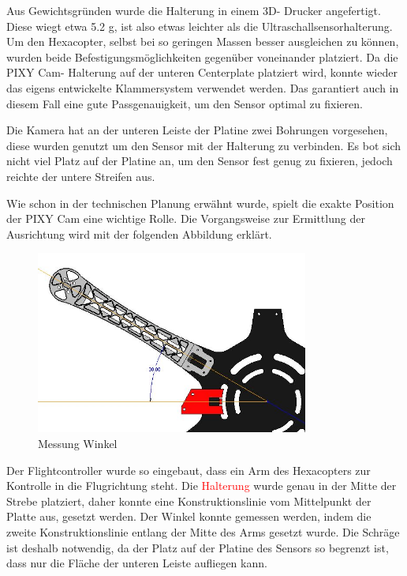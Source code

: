 	Aus Gewichtsgründen wurde die Halterung in einem 3D- Drucker angefertigt.
	Diese wiegt etwa 5.2 g, ist also etwas leichter als die Ultraschallsensorhalterung.
	Um den Hexacopter, selbst bei so geringen Massen besser ausgleichen zu können, wurden beide Befestigungsmöglichkeiten gegenüber voneinander platziert.
	Da die PIXY Cam- Halterung auf der unteren Centerplate platziert wird, konnte wieder das eigens entwickelte Klammersystem verwendet werden.
	Das garantiert auch in diesem Fall eine gute Passgenauigkeit, um den Sensor optimal zu fixieren.

	Die Kamera hat an der unteren Leiste der Platine zwei Bohrungen vorgesehen, diese wurden genutzt um den Sensor mit der Halterung zu verbinden.
	Es bot sich nicht viel Platz auf der Platine an, um den Sensor fest genug zu fixieren, jedoch reichte der untere Streifen aus.

	Wie schon in der technischen Planung erwähnt wurde, spielt die exakte Position der PIXY Cam eine wichtige Rolle.
	Die Vorgangsweise zur Ermittlung der Ausrichtung wird mit der folgenden Abbildung erklärt.

			\begin{figure}[tbh]
			\begin{centering}
			\includegraphics[width = 0.8\textwidth]{Bilder/winkel_pixy}
			\par\end{centering}
			\caption{Messung Winkel}
			\label{winkel_pixy}
			\end{figure}

	Der Flightcontroller wurde so eingebaut, dass ein Arm des Hexacopters zur Kontrolle in die Flugrichtung steht.
	Die \textcolor{red}{Halterung} wurde genau in der Mitte der Strebe platziert, daher konnte eine Konstruktionslinie vom Mittelpunkt der Platte aus, gesetzt werden.
	Der Winkel konnte gemessen werden, indem die zweite Konstruktionslinie entlang der Mitte des Arms gesetzt wurde.
	Die Schräge ist deshalb notwendig, da der Platz auf der Platine des Sensors so begrenzt ist, dass nur die Fläche der unteren Leiste aufliegen kann.

